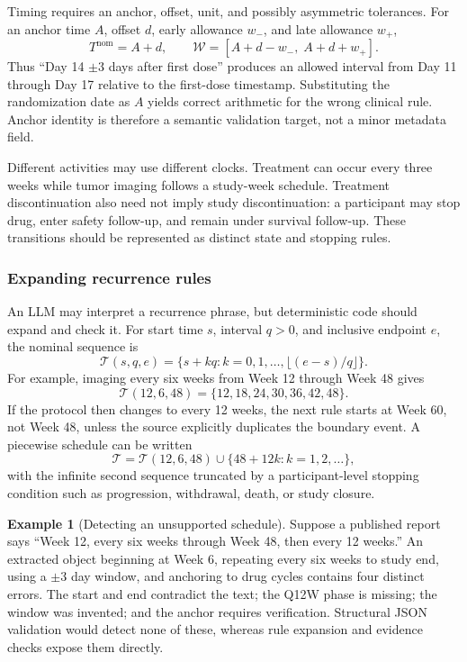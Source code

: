 \documentclass[12pt,oneside]{book}
\numberwithin{equation}{section}
\theoremstyle{definition}
\newtheorem{example}{Example}[section]
\theoremstyle{plain}
\theoremstyle{remark}
\begin{document}
Timing requires an anchor, offset, unit, and possibly asymmetric tolerances.
For an anchor time $A$, offset $d$, early allowance $w_-$, and late allowance
$w_+$,
\[
 T^{\mathrm{nom}}=A+d,
 \qquad
 \mathcal W=[A+d-w_-,\;A+d+w_+].
\]
Thus ``Day 14 $\pm 3$ days after first dose'' produces an allowed interval from
Day 11 through Day 17 relative to the first-dose timestamp.  Substituting the
randomization date as $A$ yields correct arithmetic for the wrong clinical
rule.  Anchor identity is therefore a semantic validation target, not a minor
metadata field.

Different activities may use different clocks.  Treatment can occur every
three weeks while tumor imaging follows a study-week schedule.  Treatment
discontinuation also need not imply study discontinuation: a participant may
stop drug, enter safety follow-up, and remain under survival follow-up.  These
transitions should be represented as distinct state and stopping rules.

\subsubsection{Expanding recurrence rules}

An LLM may interpret a recurrence phrase, but deterministic code should expand
and check it.  For start time $s$, interval $q>0$, and inclusive endpoint $e$,
the nominal sequence is
\[
  \mathcal T(s,q,e)=\{s+kq:k=0,1,\ldots,
       \lfloor(e-s)/q\rfloor\}.
\]
For example, imaging every six weeks from Week 12 through Week 48 gives
\[
  \mathcal T(12,6,48)=\{12,18,24,30,36,42,48\}.
\]
If the protocol then changes to every 12 weeks, the next rule starts at Week 60,
not Week 48, unless the source explicitly duplicates the boundary event.  A
piecewise schedule can be written
\[
 \mathcal T
 =\mathcal T(12,6,48)
   \cup\{48+12k:k=1,2,\ldots\},
\]
with the infinite second sequence truncated by a participant-level stopping
condition such as progression, withdrawal, death, or study closure.

\begin{example}[Detecting an unsupported schedule]
Suppose a published report says ``Week 12, every six weeks through Week 48,
then every 12 weeks.''  An extracted object beginning at Week 6, repeating
every six weeks to study end, using a $\pm3$ day window, and anchoring to drug
cycles contains four distinct errors.  The start and end contradict the text;
the Q12W phase is missing; the window was invented; and the anchor requires
verification.  Structural JSON validation would detect none of these, whereas
rule expansion and evidence checks expose them directly.
\end{example}
\end{document}
